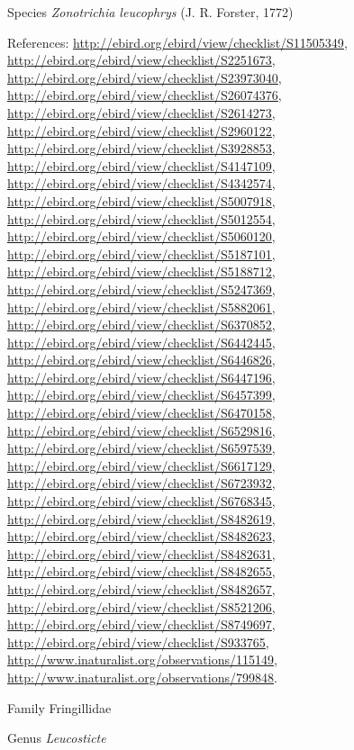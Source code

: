 \documentclass[9pt, article]{memoir}
\begin{document}
\begin{multicols}{2}
\vspace{6pt}\noindent\hspace{36pt}Species \textit{Zonotrichia leucophrys} (J. R. Forster, 1772)


\vspace{6pt}References: 
\url{http://ebird.org/ebird/view/checklist/S11505349}, 
\url{http://ebird.org/ebird/view/checklist/S2251673}, 
\url{http://ebird.org/ebird/view/checklist/S23973040}, 
\url{http://ebird.org/ebird/view/checklist/S26074376}, 
\url{http://ebird.org/ebird/view/checklist/S2614273}, 
\url{http://ebird.org/ebird/view/checklist/S2960122}, 
\url{http://ebird.org/ebird/view/checklist/S3928853}, 
\url{http://ebird.org/ebird/view/checklist/S4147109}, 
\url{http://ebird.org/ebird/view/checklist/S4342574}, 
\url{http://ebird.org/ebird/view/checklist/S5007918}, 
\url{http://ebird.org/ebird/view/checklist/S5012554}, 
\url{http://ebird.org/ebird/view/checklist/S5060120}, 
\url{http://ebird.org/ebird/view/checklist/S5187101}, 
\url{http://ebird.org/ebird/view/checklist/S5188712}, 
\url{http://ebird.org/ebird/view/checklist/S5247369}, 
\url{http://ebird.org/ebird/view/checklist/S5882061}, 
\url{http://ebird.org/ebird/view/checklist/S6370852}, 
\url{http://ebird.org/ebird/view/checklist/S6442445}, 
\url{http://ebird.org/ebird/view/checklist/S6446826}, 
\url{http://ebird.org/ebird/view/checklist/S6447196}, 
\url{http://ebird.org/ebird/view/checklist/S6457399}, 
\url{http://ebird.org/ebird/view/checklist/S6470158}, 
\url{http://ebird.org/ebird/view/checklist/S6529816}, 
\url{http://ebird.org/ebird/view/checklist/S6597539}, 
\url{http://ebird.org/ebird/view/checklist/S6617129}, 
\url{http://ebird.org/ebird/view/checklist/S6723932}, 
\url{http://ebird.org/ebird/view/checklist/S6768345}, 
\url{http://ebird.org/ebird/view/checklist/S8482619}, 
\url{http://ebird.org/ebird/view/checklist/S8482623}, 
\url{http://ebird.org/ebird/view/checklist/S8482631}, 
\url{http://ebird.org/ebird/view/checklist/S8482655}, 
\url{http://ebird.org/ebird/view/checklist/S8482657}, 
\url{http://ebird.org/ebird/view/checklist/S8521206}, 
\url{http://ebird.org/ebird/view/checklist/S8749697}, 
\url{http://ebird.org/ebird/view/checklist/S933765}, 
\url{http://www.inaturalist.org/observations/115149}, 
\url{http://www.inaturalist.org/observations/799848}.

\vspace{6pt}\noindent\hspace{24pt}Family Fringillidae


\vspace{6pt}\noindent\hspace{30pt}Genus \textit{Leucosticte}



\end{multicols}
\end{document}
